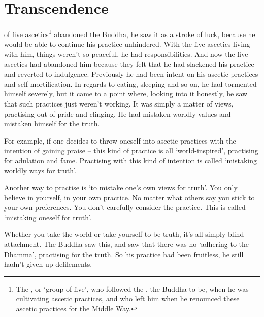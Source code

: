 
\chapter{Transcendence}

 of five ascetics\footnote{The , or `group of five', who followed the , the Buddha-to-be, when he was cultivating ascetic practices, and who left him when he renounced these ascetic practices for the Middle Way.} abandoned the Buddha, he saw it as a stroke of luck, because he would be able to continue his practice unhindered. With the five ascetics living with him, things weren't so peaceful, he had responsibilities. And now the five ascetics had abandoned him because they felt that he had slackened his practice and reverted to indulgence. Previously he had been intent on his ascetic practices and self-mortification. In regards to eating, sleeping and so on, he had tormented himself severely, but it came to a point where, looking into it honestly, he saw that such practices just weren't working. It was simply a matter of views, practising out of pride and clinging. He had mistaken worldly values and mistaken himself for the truth. 

For example, if one decides to throw oneself into ascetic practices with the intention of gaining praise -- this kind of practice is all `world-inspired', practising for adulation and fame. Practising with this kind of intention is called `mistaking worldly ways for truth'. 

Another way to practise is `to mistake one's own views for truth'. You only believe in yourself, in your own practice. No matter what others say you stick to your own preferences. You don't carefully consider the practice. This is called `mistaking oneself for truth'. 

Whether you take the world or take yourself to be truth, it's all simply blind attachment. The Buddha saw this, and saw that there was no `adhering to the Dhamma', practising for the truth. So his practice had been fruitless, he still hadn't given up defilements. 


